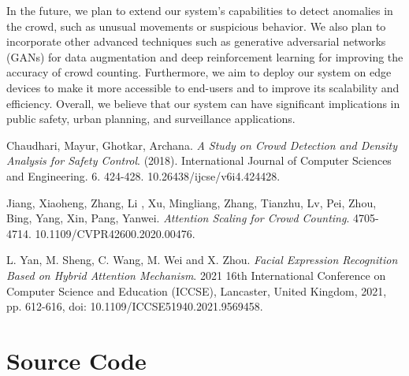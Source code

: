 \documentclass[12pt]{report}
\begin{document}
In the future, we plan to extend our system's capabilities to detect anomalies in the crowd, such as unusual movements or suspicious behavior. We also plan to incorporate other advanced techniques such as generative adversarial networks (GANs) for data augmentation and deep reinforcement learning for improving the accuracy of crowd counting. Furthermore, we aim to deploy our system on edge devices to make it more accessible to end-users and to improve its scalability and efficiency. Overall, we believe that our system can have significant implications in public safety, urban planning, and surveillance applications.
\newline


\begin{thebibliography}{9}
Chaudhari, Mayur, Ghotkar, Archana.
\textit{A Study on Crowd Detection and Density Analysis for Safety Control}. 
(2018). International Journal of Computer Sciences and Engineering. 6. 424-428. 10.26438/ijcse/v6i4.424428. 
 
Jiang, Xiaoheng, Zhang, Li , Xu, Mingliang, Zhang, Tianzhu,  Lv, Pei,  Zhou, Bing,  Yang, Xin,  Pang, Yanwei. 
\textit{Attention Scaling for Crowd Counting}. 
4705-4714. 10.1109/CVPR42600.2020.00476.

L. Yan, M. Sheng, C. Wang, M. Wei and X. Zhou. 
\textit{Facial Expression Recognition Based on Hybrid Attention Mechanism}. 
2021 16th International Conference on Computer Science and Education (ICCSE), Lancaster, United Kingdom, 2021, pp. 612-616, doi: 10.1109/ICCSE51940.2021.9569458.
 
\end{thebibliography}


\appendix
\chapter{Source Code}
\end{document}
